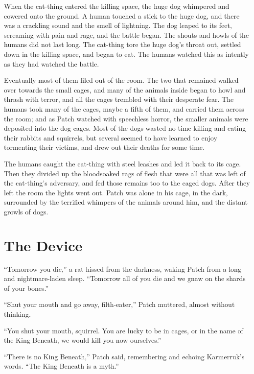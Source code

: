\documentclass[ebook,oneside,openany,17pt]{memoir}
\newenvironment{tolerant}[1]{%
  \par\tolerance=#1\relax
}{%
  \par
}
\renewcommand{\thechapter}{\Roman{chapter}}
\newcounter{sections}
\newcommand{\sections}[1]{%
  \section*{#1}
  \addtocounter{sections}{1}%
  \pdfbookmark[1]{#1}{section.\thechapter.\thesections}}
\begin{document}
When the cat-thing entered the killing space, the huge dog whimpered
and cowered onto the ground. A human touched a stick to the huge dog,
and there was a crackling sound and the smell of lightning. The dog
leaped to its feet, screaming with pain and rage, and the battle
began. The shouts and howls of the humans did not last long. The
cat-thing tore the huge dog’s throat out, settled down in the killing
space, and began to eat. The humans watched this as intently as they
had watched the battle.

\begin{tolerant}{1000}
Eventually most of them filed out of the room. The two that remained
walked over towards the small cages, and many of the animals inside
began to howl and thrash with terror, and all the cages trembled with
their desperate fear. The humans took many of the cages, maybe a fifth
of them, and carried them across the room; and as Patch watched with
speechless horror, the smaller animals were deposited into the
dog-cages. Most of the dogs wasted no time killing and eating their
rabbits and squirrels, but several seemed to have learned to enjoy
tormenting their victims, and drew out their deaths for some time.
\end{tolerant}

\begin{tolerant}{1000}
The humans caught the cat-thing with steel leash\-es and led it back to
its cage. Then they divided up the bloodsoaked rags of flesh that were
all that was left of the cat-thing’s adversary, and fed those remains
too to the caged dogs. After they left the room the lights went
out. Patch was alone in his cage, in the dark, surrounded by the
terrified whimpers of the animals around him, and the distant growls
of dogs.
\end{tolerant}


\sections{The Device}

“Tomorrow you die,” a rat hissed from the darkness, waking Patch from
a long and nightmare-laden sleep. “Tomorrow all of you die and we gnaw
on the shards of your bones.”

“Shut your mouth and go away, filth-eater,” Patch muttered, almost
without thinking.

“You shut your mouth, squirrel. You are lucky to be in cages, or in
the name of the King Beneath, we would kill you now ourselves.”

“There is no King Beneath,” Patch said, remembering and echoing
Karmerruk’s words. “The King Beneath is a myth.”
\end{document}
